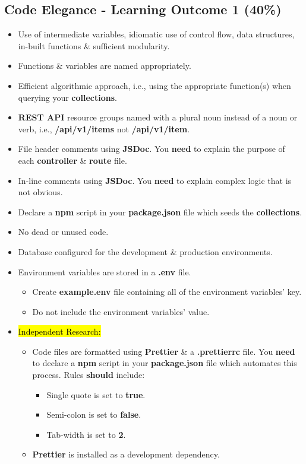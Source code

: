 \documentclass{article}
\begin{document}
\subsection*{Code Elegance - Learning Outcome 1 (40\%)}
\begin{itemize}
	\item Use of intermediate variables, idiomatic use of control flow, data structures, in-built functions \& sufficient modularity.
	\item Functions \& variables are named appropriately.
	\item Efficient algorithmic approach, i.e., using the appropriate function(s) when querying your \textbf{collections}.
	\item \textbf{REST API} resource groups named with a plural noun instead of a noun or verb, i.e., \textbf{/api/v1/items} not \textbf{/api/v1/item}.
	\item File header comments using \textbf{JSDoc}. You \textbf{need} to explain the purpose of each \textbf{controller} \& \textbf{route} file. 
	\item In-line comments using \textbf{JSDoc}. You \textbf{need} to explain complex logic that is not obvious.
	\item Declare a \textbf{npm} script in your \textbf{package.json} file which seeds the \textbf{collections}.
	\item No dead or unused code.
	\item Database configured for the development \& production environments.
	\item Environment variables are stored in a \textbf{.env} file.
	\begin{itemize}
		\item Create \textbf{example.env} file containing all of the environment variables' key. 
		\item Do not include the environment variables' value.  
	\end{itemize}  
	\item \hl{Independent Research:}
	\begin{itemize}
		\item Code files are formatted using \textbf{Prettier} \& a \textbf{.prettierrc} file. You \textbf{need} to declare a \textbf{npm} script in your \textbf{package.json} file which automates this process. Rules \textbf{should} include:
		\begin{itemize}
			\item Single quote is set to \textbf{true}.
			\item Semi-colon is set to \textbf{false}.
			\item Tab-width is set to \textbf{2}.
		\end{itemize}
		\item \textbf{Prettier} is installed as a development dependency.
	\end{itemize}
\end{itemize}
\end{document}
